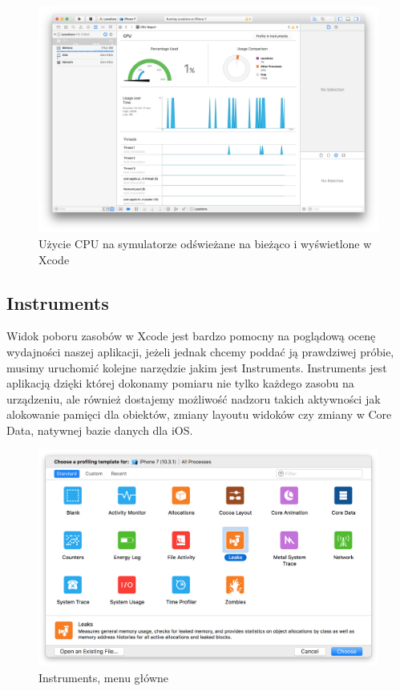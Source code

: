 \begin{figure}[ht!]
  \centering
  \includegraphics[width=120mm]{images/chapter-2-image-5-debugger.png}
  \caption{Użycie CPU na symulatorze odświeżane na bieżąco i wyświetlone w Xcode}
  \label{chapter-2-image-5-debugger}
\end{figure}

\subsection{Instruments}

Widok poboru zasobów w Xcode jest bardzo pomocny na poglądową ocenę wydajności naszej aplikacji, jeżeli jednak chcemy poddać ją prawdziwej próbie, musimy uruchomić kolejne narzędzie jakim jest Instruments. Instruments jest aplikacją dzięki której dokonamy pomiaru nie tylko każdego zasobu na urządzeniu, ale również dostajemy możliwość nadzoru takich aktywności jak alokowanie pamięci dla obiektów, zmiany layoutu widoków czy zmiany w Core Data, natywnej bazie danych dla iOS.

\begin{figure}[ht!]
  \centering
  \includegraphics[width=120mm]{images/chapter-2-image-6-instruments.png}
  \caption{Instruments, menu główne}
  \label{chapter-2-image-6-instruments}
\end{figure}

